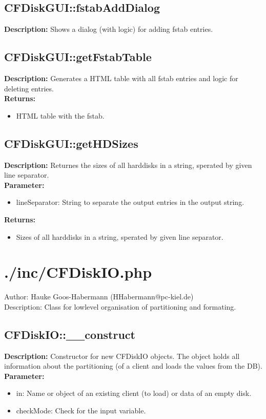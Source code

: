 \subsection{CFDiskGUI::fstabAddDialog}
\textbf{Description:} Shows a dialog (with logic) for adding fstab entries.\\

\subsection{CFDiskGUI::getFstabTable}
\textbf{Description:} Generates a HTML table with all fstab entries and logic for deleting entries.\\
\textbf{Returns:}
\begin{itemize}
\item HTML table with the fstab.
\end{itemize}

\subsection{CFDiskGUI::getHDSizes}
\textbf{Description:} Returnes the sizes of all harddisks in a string, sperated by given line separator.\\
\textbf{Parameter:}
\begin{itemize}
\item lineSeparator: String to separate the output entries in the output string.
\end{itemize}
\textbf{Returns:}
\begin{itemize}
\item Sizes of all harddisks in a string, sperated by given line separator.
\end{itemize}

\newpage\section{./inc/CFDiskIO.php}
 Author: Hauke Goos-Habermann (HHabermann@pc-kiel.de)\\
 Description: Class for lowlevel organisation of partitioning and formating.\\

\subsection{CFDiskIO::\_\_construct}
\textbf{Description:} Constructor for new CFDiskIO objects. The object holds all information about the partitioning (of a client and loads the values from the DB).\\
\textbf{Parameter:}
\begin{itemize}
\item in: Name or object of an existing client (to load) or data of an empty disk.
\item checkMode: Check for the input variable.
\end{itemize}

